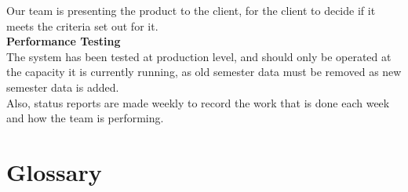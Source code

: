 \documentclass[11pt]{article}
\begin{document}
Our team is presenting the product to the client, for the client to decide if it meets the criteria set out for it. \\

\hspace{-.5in} \textbf{Performance Testing} \\

The system has been tested at production level, and should only be operated at the capacity it is currently running, as old semester data must be removed as new semester data is added.\\ 

Also, status reports are made weekly to record the work that is done each week and how the team is performing.

\pagebreak[4]

\section{Glossary} \label{sec:glossary}


\end{document}

